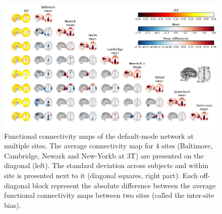 \documentclass[authoryear]{elsarticle}
\begin{document}
\begin{figure}[H]
\begin{center}
\includegraphics[width=\linewidth]{../figures/pccmap_multisite.png}
\end{center}
\caption[DMN variability across sites]{
Functional connectivity maps of the default-mode network at multiple sites. The average connectivity map for 4 sites (Baltimore, Cambridge, Newark and New-Yorkb at 3T) are presented on the diagonal (left). The standard deviation across subjects and within site is presented next to it (diagonal squares, right part). Each off-diagonal block represent the absolute difference between the average functional connectivity maps between two sites (called the inter-site bias).
}
\label{fig_DMN_variability}
\end{figure}
\end{document}
